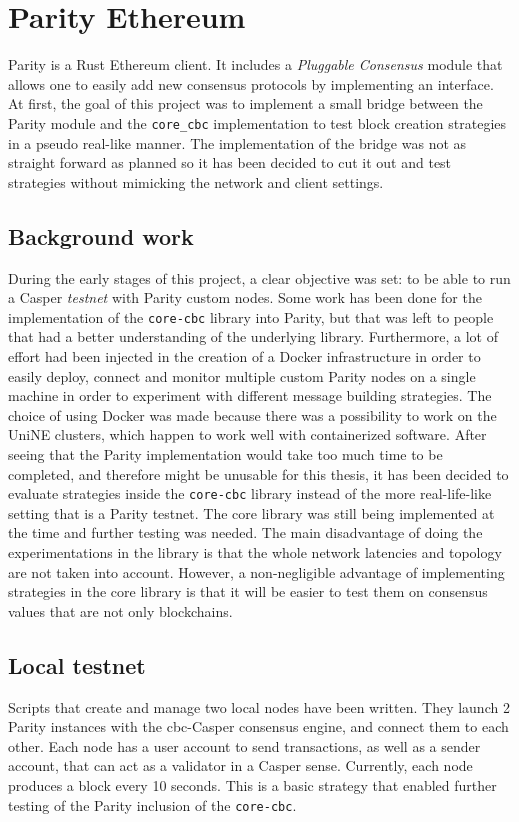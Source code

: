 \section{Parity Ethereum}
Parity is a Rust Ethereum client. It includes a \textit{Pluggable Consensus}
module that allows one to easily add new consensus protocols by implementing an
interface.  At first, the goal of this project was to implement a small bridge
between the Parity module and the \texttt{core\_cbc} implementation to test block creation
strategies in a pseudo real-like manner. The implementation of the bridge was
not as straight forward as planned so it has been decided to cut it out and test
strategies without mimicking the network and client settings.

\subsection{Background work}
During the early stages of this project, a clear objective was set: to be able
to run a Casper \textit{testnet} with Parity custom nodes. Some work has been
done for the implementation of the \texttt{core-cbc} library into Parity, but
that was left to people that had a better understanding of the underlying
library. Furthermore,  a lot of effort had been
injected in the creation of a Docker infrastructure in order to easily deploy,
connect and monitor multiple custom Parity nodes on a single machine in order to
experiment with different message building strategies. The choice of using
Docker was made because there was a  possibility to work on the UniNE clusters,
which happen to work well with containerized software. After seeing that the
Parity implementation would take too much time to be completed, and therefore
might be unusable for this thesis, it has been decided to evaluate strategies
inside the \texttt{core-cbc} library instead of the more real-life-like setting
that is a Parity testnet. The core library was still being implemented at the
time and further testing was needed. The main disadvantage of doing the experimentations in
the library is that the whole network latencies and topology are not taken into
account. However, a non-negligible advantage of implementing strategies in the
core library is that it will be easier to test them on consensus values that are
not only blockchains.

\subsection{Local testnet}
Scripts that create and manage two local nodes have been written. They launch 2
Parity instances with the \gls{cbc}-Casper consensus engine, and connect them
to each other. Each node has a user account to send transactions, as well as a
sender account, that can act as a validator in a Casper sense. Currently, each
node produces a block every 10 seconds. This is a basic strategy that enabled
further testing of the Parity inclusion of the \texttt{core-cbc}.

